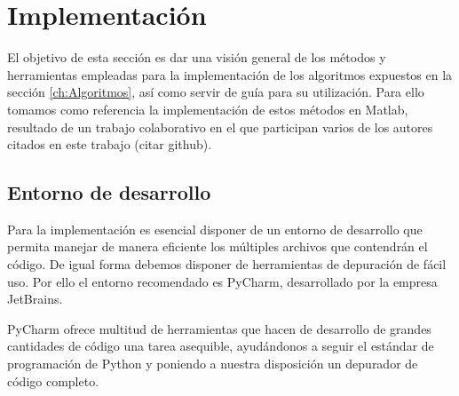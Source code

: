 






\chapter{Implementación}\label{ch:Impl}

El objetivo de esta sección es dar una visión general de los métodos y herramientas empleadas para la implementación de los algoritmos expuestos en la sección \ref{ch:Algoritmos}, así como servir de guía para su utilización. Para ello tomamos como referencia la implementación de estos métodos en Matlab, resultado de un trabajo colaborativo en el que participan varios de los autores citados en este trabajo (citar github).

\section{Entorno de desarrollo}

Para la implementación es esencial disponer de un entorno de desarrollo que permita manejar de manera eficiente los múltiples archivos que contendrán el código. De igual forma debemos disponer de herramientas de depuración de fácil uso. Por ello el entorno recomendado es PyCharm, desarrollado por la empresa JetBrains.

PyCharm ofrece multitud de herramientas que hacen de desarrollo de grandes cantidades de código una tarea asequible, ayudándonos a seguir el estándar de programación de Python y poniendo a nuestra disposición un depurador de código completo.

